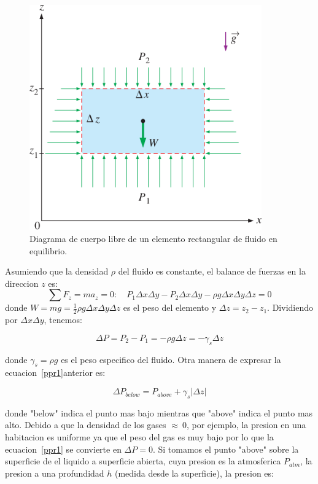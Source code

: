 \documentclass[10pt, oneside]{article}
\begin{document}
\begin{figure}[h]
\centering
\includegraphics[width=10cm]{pres2}
\caption{Diagrama de cuerpo libre de un elemento rectangular de fluido en equilibrio.}
\label{pres2}
\end{figure}

Asumiendo que la densidad $\rho$ del fluido es constante, el balance de fuerzas en la direccion $z$ es:
$$
\sum F_z = m a_z = 0: \quad P_1 \Delta x \Delta y - P_2 \Delta x \Delta y - \rho g \Delta x \Delta y \Delta z = 0
$$
donde $W = mg = \frac{1}{2} \rho g \Delta x \Delta y \Delta z$ es el peso del elemento y $\Delta z = z_2 - z_1 $. Dividiendo por $\Delta x \Delta y$, tenemos:

\begin{equation}
\Delta P = P_2 - P_1 = -\rho g \Delta z = -\gamma_s \Delta z
\label{ppr1}
\end{equation}

donde $\gamma_s = \rho g$ es el peso especifico  del fluido. Otra manera de expresar la ecuacion~\ref{ppr1}anterior es:

\begin{equation}
\Delta P_{below} = P_{above} + \gamma_s |\Delta z|
\label{ppr2}
\end{equation}

donde "below" indica el punto mas bajo mientras que "above" indica el punto mas alto. Debido a que la densidad de los gases $\approx\ 0$, por ejemplo, la presion en una habitacion es uniforme ya que el peso del gas es muy bajo por lo que la ecuacion~\ref{ppr1} se convierte en $\Delta P=0$. 
Si tomamos el punto "above" sobre la superficie de el liquido a superficie abierta, cuya presion es la atmosferica $P_{atm}$, la presion a una profundidad $h$ (medida desde la superficie), la presion es:
\end{document}
